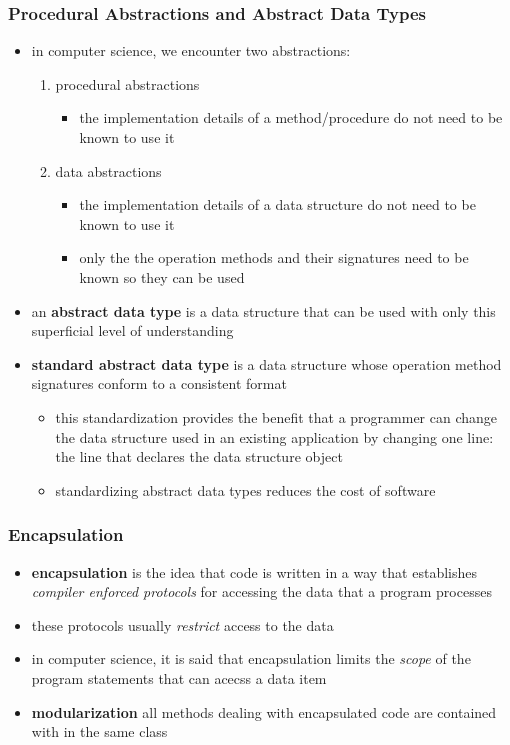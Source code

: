 \documentclass[11pt]{article}
\begin{document}
\subsubsection{Procedural Abstractions and Abstract Data Types}
\label{sec:org56eeea8}
\begin{itemize}
\item in computer science, we encounter two abstractions:
\begin{enumerate}
\item procedural abstractions
\begin{itemize}
\item the implementation details of a method/procedure do not need to be known to use it
\end{itemize}
\item data abstractions
\begin{itemize}
\item the implementation details of a data structure do not need to be known to use it
\item only the the operation methods and their signatures need to be known so they can be used
\end{itemize}
\end{enumerate}
\item an \textbf{abstract data type} is a data structure that can be used with only this superficial level of understanding
\item \textbf{standard abstract data type} is a data structure whose operation method signatures conform to a consistent format
\begin{itemize}
\item this standardization provides the benefit that a programmer can change the data structure used in an existing application by changing one line: the line that declares the data structure object
\item standardizing abstract data types reduces the cost of software
\end{itemize}
\end{itemize}
\subsubsection{Encapsulation}
\label{sec:org488b21d}
\begin{itemize}
\item \textbf{encapsulation} is the idea that code is written in a way that establishes \emph{compiler enforced protocols} for accessing the data that a program processes
\item these protocols usually \emph{restrict} access to the data
\item in computer science, it is said that encapsulation limits the \emph{scope} of the program statements that can acecss a data item
\item \textbf{modularization} all methods dealing with encapsulated code are contained with in the same class
\end{itemize}
\end{document}
